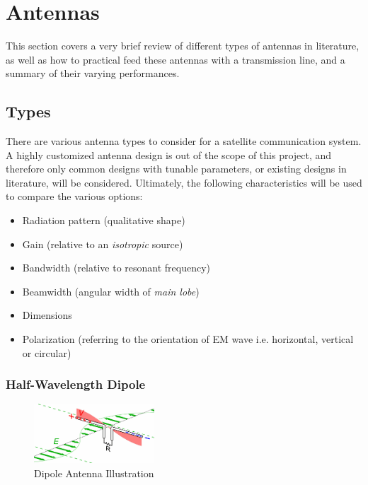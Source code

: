 \graphicspath{{./figures}}

\section{Antennas}\label{sec:antenna_theory}

This section covers a very brief review of different types of antennas in literature, as well as how to practical feed these antennas with a transmission line, and a summary of their varying performances.

\subsection{Types}\label{sec:antenna_types}
There are various antenna types to consider for a satellite communication system. A highly customized antenna design is out of the scope of this project, and therefore only common designs with tunable parameters, or existing designs in literature, will be considered. Ultimately, the following characteristics will be used to compare the various options:
\begin{itemize}
    \item Radiation pattern (qualitative shape)
    \item Gain (relative to an \textit{isotropic} source) 
    \item Bandwidth (relative to resonant frequency)
    \item Beamwidth (angular width of \textit{main lobe})
    \item Dimensions
    \item Polarization (referring to the orientation of EM wave i.e. horizontal, vertical or circular)
\end{itemize}

\subsubsection{Half-Wavelength Dipole}
\begin{figure}[!htb]
  \centering
  \includegraphics[width=0.4\textwidth]{dipole}
  \caption{Dipole Antenna Illustration \cite{site-designingDipole}}
  \label{fig:dipole}
\end{figure}

